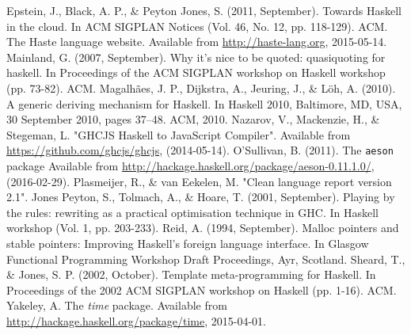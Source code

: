 \documentclass[preprint]{sigplanconf}
\begin{document}
\begin{thebibliography}{}
  Epstein, J., Black, A. P., \& Peyton Jones, S. (2011, September).
  Towards Haskell in the cloud.
  In ACM SIGPLAN Notices (Vol. 46, No. 12, pp. 118-129). ACM.
  The Haste language website.
  Available from \url{http://haste-lang.org}, 2015-05-14.
  Mainland, G. (2007, September).
  Why it's nice to be quoted: quasiquoting for haskell.
  In Proceedings of the ACM SIGPLAN workshop on Haskell workshop (pp. 73-82).
  ACM.
  Magalhães, J. P., Dijkstra, A., Jeuring, J., \& Löh, A. (2010).
  A generic deriving mechanism for Haskell.
  In Haskell 2010, Baltimore, MD, USA, 30 September 2010, pages 37–48. ACM, 2010.
  Nazarov, V., Mackenzie, H., \& Stegeman, L.
  "GHCJS Haskell to JavaScript Compiler".
  Available from \url{https://github.com/ghcjs/ghcjs}, (2014-05-14).
  O'Sullivan, B. (2011).
  The {\tt aeson} package
  Available from \url{http://hackage.haskell.org/package/aeson-0.11.1.0/}, (2016-02-29).
  Plasmeijer, R., \& van Eekelen, M.
  "Clean language report version 2.1".
  Jones Peyton, S., Tolmach, A., \& Hoare, T. (2001, September).
  Playing by the rules: rewriting as a practical optimisation technique in GHC.
  In Haskell workshop (Vol. 1, pp. 203-233).
  Reid, A. (1994, September).
  Malloc pointers and stable pointers: Improving Haskell's foreign language
  interface.
  In Glasgow Functional Programming Workshop Draft Proceedings, Ayr, Scotland.
  Sheard, T., \& Jones, S. P. (2002, October).
  Template meta-programming for Haskell.
  In Proceedings of the 2002 ACM SIGPLAN workshop on Haskell (pp. 1-16). ACM.
  Yakeley, A.
  The \emph{time} package.
  Available from \url{http://hackage.haskell.org/package/time}, 2015-04-01.
\end{thebibliography}
\end{document}
